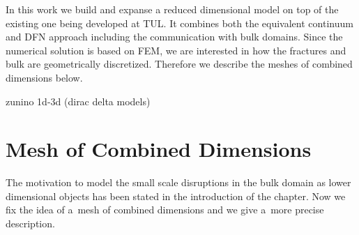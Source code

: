 In this work we build and expanse a reduced dimensional model on top of the existing one being developed at TUL.
It combines both the equivalent continuum and DFN approach including the communication with bulk domains.
Since the numerical solution is based on FEM, we are interested in how the fractures and bulk are geometrically discretized.
Therefore we describe the meshes of combined dimensions below.


\cite{martin_modeling_2005}
\cite{fumagalli_numerical_2011}
\cite{dangelo_mixed_2012}
zunino 1d-3d (dirac delta models)




\section{Mesh of Combined Dimensions} \label{sec:mesh_combined}
The motivation to model the small scale disruptions in the bulk domain as lower dimensional objects has been
stated in the introduction of the chapter. Now we fix the idea of a~mesh of combined dimensions and we give
a~more precise description.

